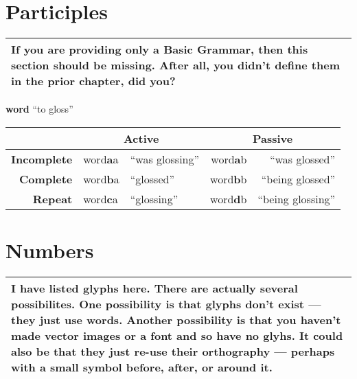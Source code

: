 \section{Participles}

\begin{center}
\begin{tabular}{|p{}|}
\hline
If you are providing only a Basic Grammar, then this section should be missing.
After all, you didn't define them in the prior chapter, did you?
\\\hline
\end{tabular}
\end{center}

\textbf{word} ``to gloss''

\begin{center}
\begin{tabular}{|r|ll|rr|}\hline
&\multicolumn{2}{c|}{\textbf{Active}}&\multicolumn{2}{|c|}{\textbf{Passive}}\\\hline
\textbf{Incomplete}&word\textbf{a}a&``was glossing''&word\textbf{a}b&``was glossed''   \\\hline
\textbf{Complete}  &word\textbf{b}a&``glossed''     &word\textbf{b}b&``being glossed'' \\\hline
\textbf{Repeat}    &word\textbf{c}a&``glossing''    &word\textbf{d}b&``being glossing''\\\hline
\end{tabular}
\end{center}

\section{Numbers}

\begin{center}
\begin{tabular}{|p{}|}
\hline
I have listed glyphs here.
There are actually several possibilites.
One possibility is that glyphs don't exist --- they just use words.
Another possibility is that you haven't made vector images or a font and so have no glyhs.
It could also be that they just re-use their orthography --- perhaps with a small symbol before, after, or around it.
\\\hline
\end{tabular}
\end{center}

